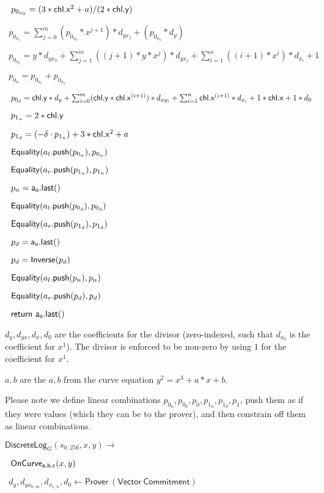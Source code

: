 \documentclass[]{article}
\begin{document}
$~~p_{0_{n_0}} = (3 * \mathsf{chl}\mathsf{.x}^2 + a) / (2 * \mathsf{chl}\mathsf{.y})$

$~~p_{0_{n_1}} = \sum^m_{j=0} (p_{0_{n_0}} * x^{j+1}) * d_{yx_j} + (p_{0_{n_0}} * d_y)$

$~~p_{0_{n_2}} = y * d_{yx_0} + \sum^m_{j=1} ((j+1) * y * x^j) * d_{yx_j} + \sum^n_{i=1} ((i+1) * x^i) * d_{x_i} + 1$

$~~p_{0_n} = p_{0_{n_1}} + p_{0_{n_2}}$

$~~p_{0_d} = \mathsf{chl}\mathsf{.y} * d_y + \sum^m_{i=0} (\mathsf{chl}\mathsf{.y} * \mathsf{chl}\mathsf{.x}^{(i+1)}) * d_{xy_{i}} + \sum^n_{i=1} \mathsf{chl}\mathsf{.x}^{(i+1)} * d_{x_{i}} + 1 * \mathsf{chl}\mathsf{.x} + 1 * d_0$

$~~p_{1_n} = 2 * \mathsf{chl}\mathsf{.y}$

$~~p_{1_d} = (-\delta \cdot p_{1_n}) + 3 * \mathsf{chl}\mathsf{.x}^2 + a$

$~~\mathsf{Equality}(a_l\mathsf{.push}(p_{0_n}), p_{0_n})$

$~~\mathsf{Equality}(a_r\mathsf{.push}(p_{1_n}), p_{1_n})$

$~~p_n = \mathsf{a_o.last()}$

$~~\mathsf{Equality}(a_l\mathsf{.push}(p_{0_d}), p_{0_d})$

$~~\mathsf{Equality}(a_r\mathsf{.push}(p_{1_d}), p_{1_d})$

$~~p_d = \mathsf{a_o.last()}$

$~~p_d = \mathsf{Inverse}(p_d)$

$~~\mathsf{Equality}(a_l\mathsf{.push}(p_n), p_n)$

$~~\mathsf{Equality}(a_r\mathsf{.push}(p_d), p_d)$

$~~\mathsf{return} ~\mathsf{a_o.last()}$

$d_y, d_{yx}, d_x, d_0$ are the coefficients for the divisor (zero-indexed, such that $d_{x_0}$ is the coefficient for $x^1$). The divisor is enforced to be non-zero by using $1$ for the coefficient for $x^1$.

$a, b$ are the $a, b$ from the curve equation $y^2 = x^3 + a * x + b$.

Please note we define linear combinations $p_{0_n}, p_{0_d}, p_0, p_{1_n}, p_{1_d}, p_1$, push them as if they were values (which they can be to the prover), and then constrain off them as linear combinations.

\newcommand{\circuitin}{\leftarrow \mathsf{Prover ~(Vector ~Commitment)}}

\newcommand{\dlog}{\mathsf{DiscreteLog}}

$\dlog_G(s_{0..256}, x, y) \rightarrow$

$~~\mathsf{OnCurve_{a,b,c}}(x, y)$

$~~d_y, d_{yx_{0..m}}, d_{x_{1..n}}, d_0 \circuitin$
\end{document}
